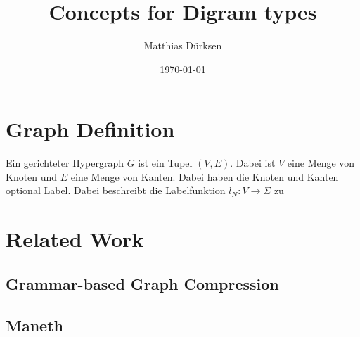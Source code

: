 \documentclass[a4paper]{scrartcl}
\title{Concepts for Digram types}
\author{Matthias Dürksen}
\date{\today}
\begin{document}
\maketitle
\section{Graph Definition}
 Ein gerichteter Hypergraph $G$ ist ein Tupel $(V,E)$. Dabei ist $V$ eine Menge von Knoten und $E$ eine Menge von Kanten.
 Dabei haben die Knoten und Kanten optional Label. Dabei beschreibt die Labelfunktion $l_N: V \to \Sigma$ zu 
 
\section{Related Work}

\subsection{Grammar-based Graph Compression}

\subsection{Maneth}
\end{document}
